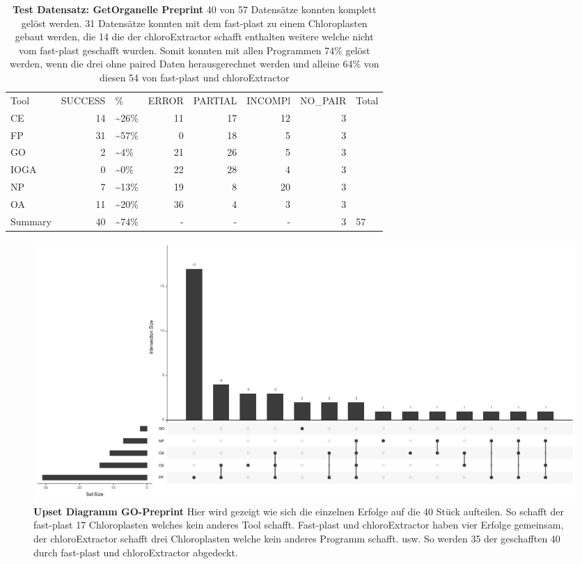\documentclass{scrartcl}
\begin{document}
\begin{table}[!h]
\caption[Test Datensatz: GetOrganelle Preprint, 11 Datensätze]{\textbf{Test Datensatz: GetOrganelle Preprint} 40 von 57 Datensätze konnten komplett gelöst werden. 31 Datensätze konnten mit dem fast-plast zu einem Chloroplasten gebaut werden, die 14 die der chloroExtractor schafft enthalten weitere welche nicht vom fast-plast geschafft wurden. Somit konnten mit allen Programmen 74\% gelöst werden, wenn die drei ohne paired Daten herausgerechnet werden und alleine 64\% von diesen 54 von fast-plast und chloroExtractor}
\begin{center}
\begin{tabular}{lrlrrrrl}
Tool & SUCCESS & \% & ERROR & PARTIAL & INCOMPl & NO\_PAIR & Total\\
CE & 14 & \textasciitilde{}26\% & 11 & 17 & 12 & 3 & \\
FP & 31 & \textasciitilde{}57\% & 0 & 18 & 5 & 3 & \\
GO & 2 & \textasciitilde{}4\% & 21 & 26 & 5 & 3 & \\
IOGA & 0 & \textasciitilde{}0\% & 22 & 28 & 4 & 3 & \\
NP & 7 & \textasciitilde{}13\% & 19 & 8 & 20 & 3 & \\
OA & 11 & \textasciitilde{}20\% & 36 & 4 & 3 & 3 & \\
Summary & 40 & \textasciitilde{}74\% & - & - & - & 3 & 57\\
\end{tabular}
\end{center}

\end{table}

\begin{figure}
\includegraphics[width=.9\linewidth]{./upset.png}
\caption[Upset Diagramm GO-Preprint]{\textbf{Upset Diagramm GO-Preprint} Hier wird gezeigt wie sich die einzelnen Erfolge auf die 40 Stück aufteilen. So schafft der fast-plast 17 Chloroplasten welches kein anderes Tool schafft. Fast-plast und chloroExtractor haben vier Erfolge gemeinsam, der chloroExtractor schafft drei Chloroplasten welche kein anderes Programm schafft. usw. So werden 35 der geschafften 40 durch fast-plast und chloroExtractor abgedeckt.}
\end{figure}
\end{document}
